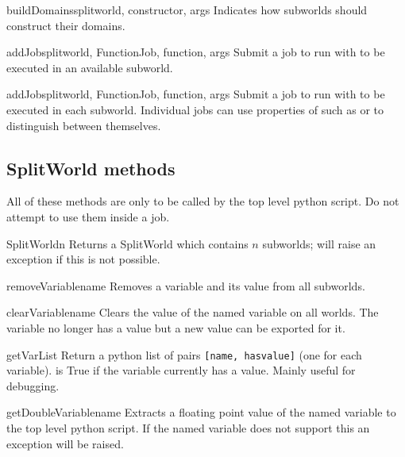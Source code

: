 \begin{funcdesc}{buildDomains}{splitworld, constructor, args}
Indicates how subworlds should construct their domains.
\end{funcdesc}

\begin{funcdesc}{addJob}{splitworld, FunctionJob, function, args}
Submit a job to run  with  to be executed in an available subworld.
\end{funcdesc}

\begin{funcdesc}{addJob}{splitworld, FunctionJob, function, args}
Submit a job to run  with  to be executed in each subworld.
Individual jobs can use properties of  such as  or  to distinguish between
themselves.
\end{funcdesc}

\subsection{SplitWorld methods}
All of these methods are only to be called by the top level python script.
Do not attempt to use them inside a job.

\begin{methoddesc}[SplitWorld]{SplitWorld}{n}
Returns a SplitWorld which contains $n$ subworlds; will raise an exception if this is not possible.
\end{methoddesc}

\begin{methoddesc}[SplitWorld]{removeVariable}{name}
Removes a variable and its value from all subworlds.
\end{methoddesc}

\begin{methoddesc}[SplitWorld]{clearVariable}{name}
Clears the value of the named variable on all worlds.
The variable no longer has a value but a new value can be exported for it.
\end{methoddesc}

\begin{methoddesc}[SplitWorld]{getVarList}{}
Return a python list of pairs \texttt{[name, hasvalue]} (one for each variable).
 is True if the variable currently has a value.
Mainly useful for debugging.
\end{methoddesc}

\begin{methoddesc}[SplitWorld]{getDoubleVariable}{name}
Extracts a floating point value of the named variable to the top level python script.
If the named variable does not support this an exception will be raised.
\end{methoddesc}

